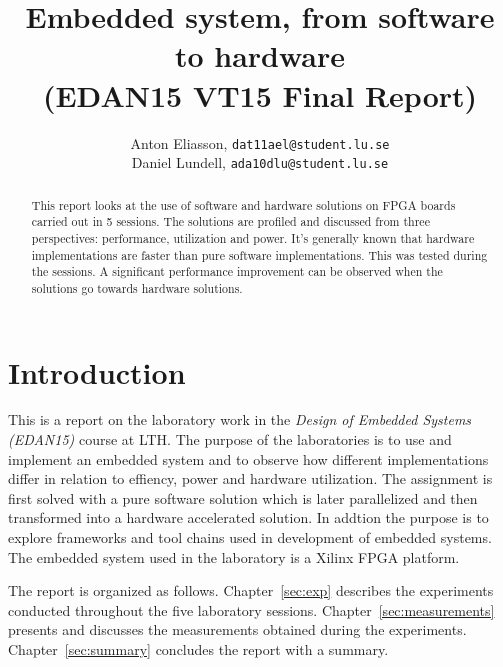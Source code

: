 \documentclass[11pt]{article}
\title{Embedded system, from software to hardware\\\small{(EDAN15 VT15 Final Report)}}
\author{
Anton Eliasson, \texttt{dat11ael@student.lu.se}\\
Daniel Lundell, \texttt{ada10dlu@student.lu.se}
}
\begin{document}
\lstset{
	language=C,
	captionpos=b,
	basicstyle=\footnotesize\ttfamily
}

\maketitle

\begin{abstract}
This report looks at the use of software and hardware solutions on FPGA boards carried out in 5 sessions. The solutions are profiled and discussed from three perspectives: performance, utilization and power. It's generally known that hardware implementations are faster than pure software implementations. This was tested during the sessions. A significant performance improvement can be observed when the solutions go towards hardware solutions.

\end{abstract}

\section{Introduction}
This is a report on the laboratory work in the \emph{Design of Embedded Systems (EDAN15)} course at LTH. The purpose of the laboratories is to use and implement an embedded system and to observe how different implementations differ in relation to effiency, power and hardware utilization. The assignment is first solved with a pure software solution which is later parallelized and then transformed into a hardware accelerated solution. In addtion the purpose is to explore frameworks and tool chains used in development of embedded systems. The embedded system used in the laboratory is a Xilinx FPGA platform.

The report is organized as follows. Chapter~\ref{sec:exp} describes the experiments conducted throughout the five laboratory sessions. Chapter~\ref{sec:measurements} presents and discusses the measurements obtained during the experiments. Chapter~\ref{sec:summary} concludes the report with a summary.


\end{document}
